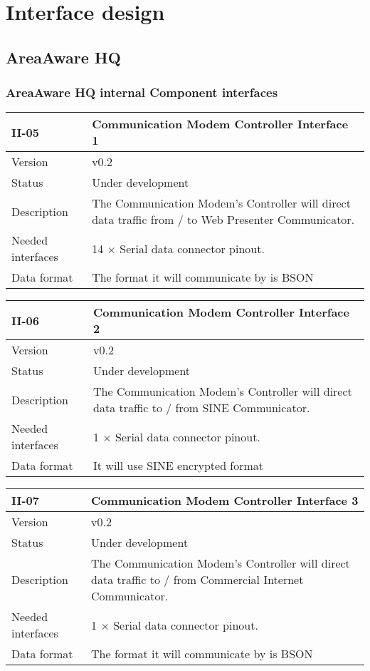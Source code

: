 \chapter{Interface design}
\label{chp_interfaceDesign}

\section{AreaAware HQ}
\label{sec:areaAwarehq}
\subsection{AreaAware HQ internal Component interfaces}
\label{subsec:areaAwarehq_internal.}

\begin{longtable}{| p{3.5cm} |  p{10cm} | }
	\hline
	\textbf{II-05} &  \textbf{Communication Modem Controller Interface 1} \\
	\hline
	Version & v0.2 \\
	\hline
	Status & Under development \\
	\hline
	Description & The Communication Modem's Controller will direct data traffic from / to Web Presenter Communicator.
	\\
	\hline
	Needed interfaces 
	& 14 $\times$ Serial data connector pinout. \\
	\hline
	Data format
	& The format it will communicate by is BSON \\
	\hline
\end{longtable}

\begin{longtable}{| p{3.5cm} |  p{10cm} | }
	\hline
	\textbf{II-06} &  \textbf{Communication Modem Controller Interface 2} \\
	\hline
	Version & v0.2 \\
	\hline
	Status & Under development \\
	\hline
	Description & The Communication Modem's Controller will direct data traffic to / from SINE Communicator.
	\\
	\hline
	Needed interfaces 
	& 1 $\times$ Serial data connector pinout. \\
	\hline
	Data format
	& It will use SINE encrypted format  \\
	\hline
\end{longtable}

\begin{longtable}{| p{3.5cm} |  p{10cm} | }
	\hline
	\textbf{II-07} &  \textbf{Communication Modem Controller Interface 3} \\
	\hline
	Version & v0.2 \\
	\hline
	Status & Under development \\
	\hline
	Description & The Communication Modem's Controller will direct data traffic to / from Commercial Internet Communicator.
	\\
	\hline
	Needed interfaces 
	& 1 $\times$ Serial data connector pinout. \\
	\hline
	Data format
	& The format it will communicate by is BSON \\
	\hline
\end{longtable}


